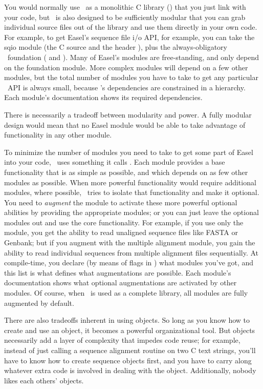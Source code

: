 You would normally use \Easel\ as a monolithic C library
() that you just link with your code, but \Easel\ is
also designed to be sufficiently modular that you can grab individual
source files out of the library and use them directly in your own
code. For example, to get Easel's sequence file i/o API, for example,
you can take the sqio module (the C source  and the
header ), plus the always-obligatory \Easel\
foundation ( and ). Many of Easel's
modules are free-standing, and only depend on the foundation
 module. More complex modules will depend on a few other
modules, but the total number of modules you have to take to get any
particular \Easel\ API is always small, because \Easel's dependencies
are constrained in a hierarchy. Each module's documentation shows its
required dependencies.

There is necessarily a tradeoff between modularity and power. A fully
modular design would mean that no Easel module would be able to take
advantage of functionality in any other module. 

To minimize the number of modules you need to take to get some part of
Easel into your code, \Easel\ uses something it calls
. Each module provides a base functionality that
is as simple as possible, and which depends on as few other modules as
possible. When more powerful functionality would require additional
modules, where possible, \Easel\ tries to isolate that functionality
and make it optional. You need to \emph{augment} the module to
activate these more powerful optional abilities by providing the
appropriate modules; or you can just leave the optional modules out
and use the core functionality.  For example, if you use only the
 module, you get the ability to read unaligned sequence
files like FASTA or Genbank; but if you augment \eslmod{sqio} with the
\eslmod{msa} multiple alignment module, you gain the ability to read
individual sequences from multiple alignment files sequentially. At
compile-time, you declare (by means of \ccode{\#define} flags in
\ccode{easel.h}) what modules you've got, and this list is what
defines what augmentations are possible. Each module's documentation
shows what optional augmentations are activated by other modules. Of
course, when \Easel\ is used as a complete \ccode{libeasel.a} library,
all modules are fully augmented by default.

There are also tradeoffs inherent in using objects. So long as you
know how to create and use an object, it becomes a powerful
organizational tool. But objects necessarily add a layer of complexity
that impedes code reuse; for example, instead of just calling a
sequence alignment routine on two C text strings, you'll have to know
how to create sequence objects first, and you have to carry along
whatever extra code is involved in dealing with the
object. Additionally, nobody likes each others' objects.

